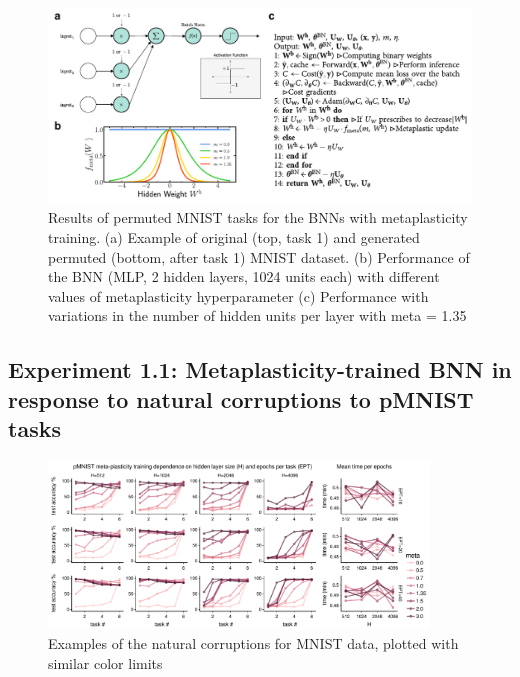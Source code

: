 \documentclass[manuscript,screen,review]{acmart}
\begin{document}
\begin{figure}[h]
    \centering
    \includegraphics[width=\textwidth]{figures/report/Fig2.pdf}
    \caption{Results of permuted MNIST tasks for the BNNs with metaplasticity training. (a) Example of original (top, task 1) and generated permuted (bottom, after task 1) MNIST dataset. (b) Performance of the BNN (MLP, 2 hidden layers, 1024 units each) with different values of metaplasticity hyperparameter (c) Performance with variations in the number of hidden units per layer with meta = 1.35}
    \label{fig:fig2}
\end{figure}

\subsection{Experiment 1.1: Metaplasticity-trained BNN in response to natural corruptions to pMNIST tasks 
}

\begin{figure}[ht]
    \centering
    \includegraphics[width=0.9\textwidth]{figures/report/Fig3.pdf}
    \caption{Examples of the natural corruptions for MNIST data, plotted with similar color limits}
    \label{fig:fig3}
\end{figure}
\end{document}
